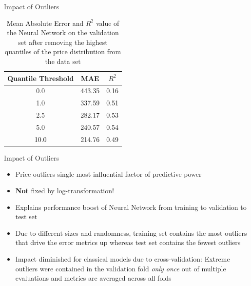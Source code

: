 \documentclass[ngerman,inputenc]{beamer}
\begin{document}
\begin{frame}{Impact of Outliers}
  \begin{table}[t]
    \centering
    \begin{tabular}{@{}ccc@{}}
      \toprule
      Quantile Threshold & MAE    & $R^2$ \\ \midrule
      0.0                & 443.35 & 0.16  \\
      1.0                & 337.59 & 0.51  \\
      2.5                & 282.17 & 0.53  \\
      5.0                & 240.57 & 0.54  \\
      10.0               & 214.76 & 0.49  \\ \bottomrule
    \end{tabular}
    \caption{Mean Absolute Error and $R^2$ value of the Neural Network on the validation set after removing the highest quantiles of the price distribution from the data set}
    \label{tab:mlp-outliers}
  \end{table}
\end{frame}

\begin{frame}{Impact of Outliers}
  \begin{itemize}
    \item Price outliers single most influential factor of predictive power
    \item \textbf{Not} fixed by log-transformation!
    \item Explains performance boost of Neural Network from training to validation to test set
    \item Due to different sizes and randomness, training set contains the most outliers that drive the error metrics up whereas test set contains the fewest outliers
    \item Impact diminished for classical models due to cross-validation: Extreme outliers were contained in the validation fold \emph{only once} out of multiple evaluations and metrics are averaged across all folds
  \end{itemize}
\end{frame}
\end{document}
